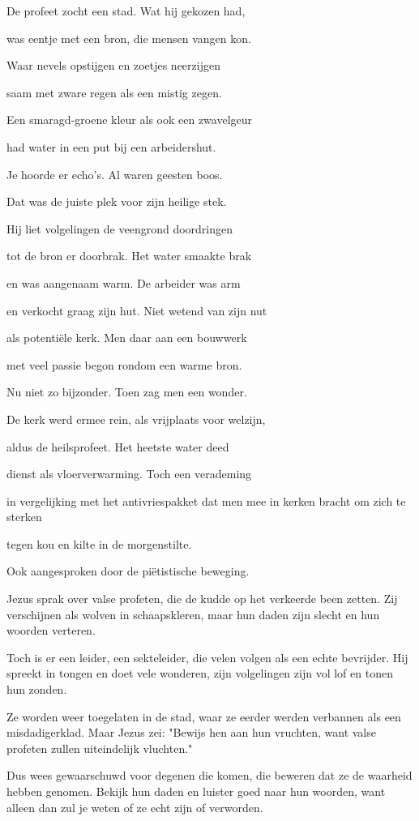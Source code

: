 De profeet zocht een stad.
Wat hij gekozen had,

was eentje met een bron,
die mensen vangen kon.

Waar nevels opstijgen
en zoetjes neerzijgen

saam met zware regen
als een mistig zegen.

Een smaragd-groene kleur
als ook een zwavelgeur

had water in een put
bij een arbeidershut.

Je hoorde er echo’s.
Al waren geesten boos.

Dat was de juiste plek
voor zijn heilige stek.

Hij liet volgelingen
de veengrond doordringen

tot de bron er doorbrak.
Het water smaakte brak

en was aangenaam warm.
De arbeider was arm

en verkocht graag zijn hut.
Niet wetend van zijn nut

als potentiële kerk.
Men daar aan een bouwwerk

met veel passie begon
rondom een warme bron.

Nu niet zo bijzonder.
Toen zag men een wonder.

De kerk werd ermee rein,
als vrijplaats voor welzijn,

aldus de heilsprofeet.
Het heetste water deed

dienst als vloerverwarming.
Toch een verademing

in vergelijking met
het antivriespakket
dat men mee in kerken
bracht om zich te sterken

tegen kou en kilte
in de morgenstilte.

Ook aangesproken door de piëtistische beweging.

Jezus sprak over valse profeten,
die de kudde op het verkeerde been zetten.
Zij verschijnen als wolven in schaapskleren,
maar hun daden zijn slecht en hun woorden verteren.

Toch is er een leider, een sekteleider,
die velen volgen als een echte bevrijder.
Hij spreekt in tongen en doet vele wonderen,
zijn volgelingen zijn vol lof en tonen hun zonden.

Ze worden weer toegelaten in de stad,
waar ze eerder werden verbannen als een misdadigerklad.
Maar Jezus zei: "Bewijs hen aan hun vruchten,
want valse profeten zullen uiteindelijk vluchten."

Dus wees gewaarschuwd voor degenen die komen,
die beweren dat ze de waarheid hebben genomen.
Bekijk hun daden en luister goed naar hun woorden,
want alleen dan zul je weten of ze echt zijn of verworden.

